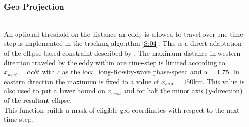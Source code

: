 \subsubsection{Geo Projection}\label{filter:projLocs}
\\
An optional threshold on the distance an eddy is allowed to travel over one time-step is implemented in the tracking algorithm \ref{S:04}. This is a direct adaptation of the ellipse-based constraint described by \cite{chelton2011}. The maximum distance in western direction traveled by the eddy within one time-step is limited according to $x_{west} = \alpha c \delta{t} $ with $c$ as the local long-Rossby-wave phase-speed and \eg $\alpha=1.75$. In eastern direction the maximum is fixed to a value of \eg $x_{east} = 150\mathrm{km}$. This value is also used to put a lower bound on $x_{west}$ and for half the minor axis ($y$-direction) of the resultant ellipse.   \\
This function builds a mask of eligible geo-coordinates with respect to the next time-step.


















